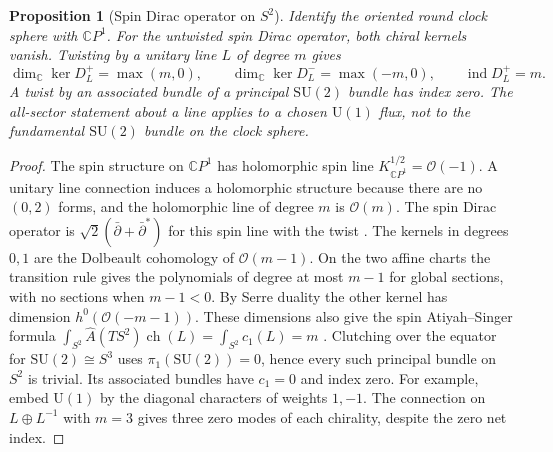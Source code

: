 \documentclass[aps,pra,onecolumn,superscriptaddress,nofootinbib,10pt]{revtex4-2}
\newtheorem{proposition}[theorem]{Proposition}
\theoremstyle{definition}
\theoremstyle{remark}
\newcommand{\SU}{\mathrm{SU}}
\newcommand{\U}{\mathrm{U}}
\begin{document}
\begin{proposition}[Spin Dirac operator on $S^2$]\label{gn:s2}
Identify the oriented round clock sphere with $\mathbb C P^1$. For the
untwisted spin Dirac operator, both chiral kernels vanish. Twisting
by a unitary line $L$ of degree $m$ gives
\[
 \dim_{\mathbb C}\ker D^+_L=\max(m,0),\qquad
 \dim_{\mathbb C}\ker D^-_L=\max(-m,0),\qquad
 \operatorname{ind}D^+_L=m.
\]
A twist by an associated bundle of a principal $\SU(2)$ bundle
has index zero. The all-sector statement about a line applies to
a chosen $\U(1)$ flux, not to the fundamental
$\SU(2)$ bundle on the clock sphere.
\end{proposition}
\begin{proof}
The spin structure on $\mathbb C P^1$ has holomorphic spin line
$K_{\mathbb C P^1}^{1/2}=\mathcal O(-1)$. A unitary line connection
induces a holomorphic structure because there are no $(0,2)$ forms,
and the holomorphic line of degree $m$ is $\mathcal O(m)$.
The spin Dirac operator is $\sqrt2(\bar\partial+\bar\partial^*)$ for
this spin line with the twist \cite[Ch.~II, \S\S4--5]{cr:lawson}.
The kernels in degrees $0,1$ are the Dolbeault cohomology of
$\mathcal O(m-1)$. On the two affine charts the transition rule gives
the polynomials of degree at most $m-1$ for global sections, with no
sections when $m-1<0$. By Serre duality the other kernel has dimension
$h^0(\mathcal O(-m-1))$. These dimensions also give the spin
Atiyah--Singer formula $\int_{S^2}\widehat A(TS^2)\operatorname{ch}(L)
=\int_{S^2}c_1(L)=m$ \cite[Theorem~1.1]{gn:AS}.
Clutching over the equator for $\SU(2)\cong S^3$ uses
$\pi_1(\SU(2))=0$, hence every such principal bundle on $S^2$
is trivial. Its associated bundles have $c_1=0$ and index zero.
For example, embed $\U(1)$ by the diagonal characters of
weights $1,-1$. The connection on $L\oplus L^{-1}$ with $m=3$
gives three zero modes of each chirality, despite the zero net index.
\end{proof}
\end{document}
